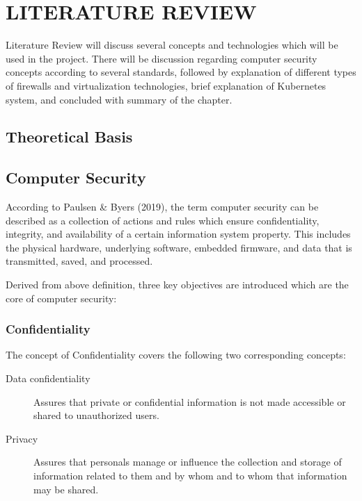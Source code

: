 \documentclass[../index.tex]{subfiles}
\begin{document}
\chapter{LITERATURE REVIEW}

Literature Review will discuss several concepts and technologies which will be used in the project.
There will be discussion regarding computer security concepts according to several standards,
followed by explanation of different types of firewalls and virtualization technologies, brief
explanation of Kubernetes system, and concluded with summary of the chapter.

\section{Theoretical Basis}

\section{Computer Security}

According to Paulsen \& Byers (2019), the term computer security can be described as a collection of
actions and rules which ensure confidentiality, integrity, and availability of a certain information
system property. This includes the physical hardware, underlying software, embedded firmware, and
data that is transmitted, saved, and processed.

Derived from above definition, three key objectives are introduced which are the core of computer
security:

\subsection{Confidentiality}

The concept of Confidentiality covers the following two corresponding concepts:

\begin{description}

	\item[Data confidentiality] Assures that private or confidential information is not made
		accessible or shared to unauthorized users.

	\item[Privacy] Assures that personals manage or influence the collection and storage of
		information related to them and by whom and to whom that information may be shared.

\end{description}
\end{document}
